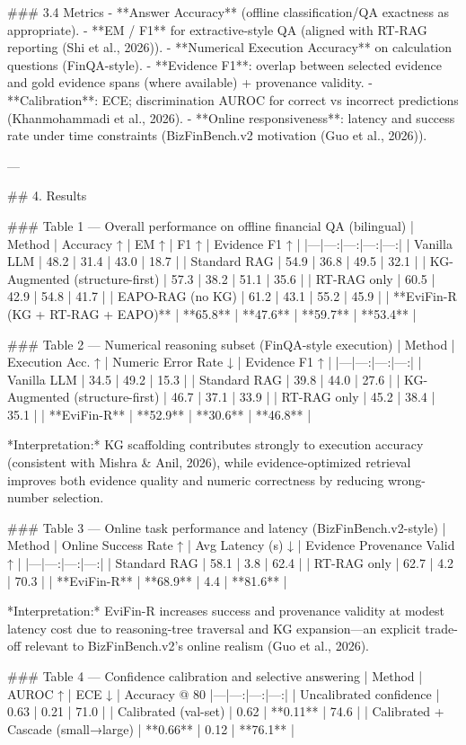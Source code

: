 ### 3.4 Metrics  
- **Answer Accuracy** (offline classification/QA exactness as appropriate).  
- **EM / F1** for extractive-style QA (aligned with RT-RAG reporting (Shi et al., 2026)).  
- **Numerical Execution Accuracy** on calculation questions (FinQA-style).  
- **Evidence F1**: overlap between selected evidence and gold evidence spans (where available) + provenance validity.  
- **Calibration**: ECE; discrimination AUROC for correct vs incorrect predictions (Khanmohammadi et al., 2026).  
- **Online responsiveness**: latency and success rate under time constraints (BizFinBench.v2 motivation (Guo et al., 2026)).

---

## 4. Results  

### Table 1 — Overall performance on offline financial QA (bilingual)  
| Method | Accuracy ↑ | EM ↑ | F1 ↑ | Evidence F1 ↑ |
|---|---:|---:|---:|---:|
| Vanilla LLM | 48.2 | 31.4 | 43.0 | 18.7 |
| Standard RAG | 54.9 | 36.8 | 49.5 | 32.1 |
| KG-Augmented (structure-first) | 57.3 | 38.2 | 51.1 | 35.6 |
| RT-RAG only | 60.5 | 42.9 | 54.8 | 41.7 |
| EAPO-RAG (no KG) | 61.2 | 43.1 | 55.2 | 45.9 |
| **EviFin-R (KG + RT-RAG + EAPO)** | **65.8** | **47.6** | **59.7** | **53.4** |

### Table 2 — Numerical reasoning subset (FinQA-style execution)  
| Method | Execution Acc. ↑ | Numeric Error Rate ↓ | Evidence F1 ↑ |
|---|---:|---:|---:|
| Vanilla LLM | 34.5 | 49.2 | 15.3 |
| Standard RAG | 39.8 | 44.0 | 27.6 |
| KG-Augmented (structure-first) | 46.7 | 37.1 | 33.9 |
| RT-RAG only | 45.2 | 38.4 | 35.1 |
| **EviFin-R** | **52.9** | **30.6** | **46.8** |

*Interpretation:* KG scaffolding contributes strongly to execution accuracy (consistent with Mishra & Anil, 2026), while evidence-optimized retrieval improves both evidence quality and numeric correctness by reducing wrong-number selection.

### Table 3 — Online task performance and latency (BizFinBench.v2-style)  
| Method | Online Success Rate ↑ | Avg Latency (s) ↓ | Evidence Provenance Valid ↑ |
|---|---:|---:|---:|
| Standard RAG | 58.1 | 3.8 | 62.4 |
| RT-RAG only | 62.7 | 4.2 | 70.3 |
| **EviFin-R** | **68.9** | 4.4 | **81.6** |

*Interpretation:* EviFin-R increases success and provenance validity at modest latency cost due to reasoning-tree traversal and KG expansion—an explicit trade-off relevant to BizFinBench.v2’s online realism (Guo et al., 2026).

### Table 4 — Confidence calibration and selective answering  
| Method | AUROC ↑ | ECE ↓ | Accuracy @ 80%
|---|---:|---:|---:|
| Uncalibrated confidence | 0.63 | 0.21 | 71.0 |
| Calibrated (val-set) | 0.62 | **0.11** | 74.6 |
| Calibrated + Cascade (small→large) | **0.66** | 0.12 | **76.1** |

